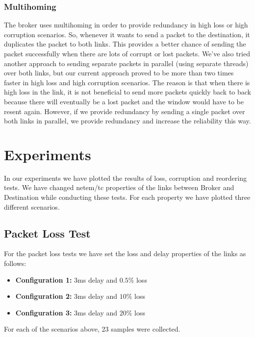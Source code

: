 \documentclass[conference]{IEEEtran}
\begin{document}
\subsubsection{Multihoming}
The broker uses multihoming in order to provide redundancy in high loss or high
corruption scenarios. So, whenever it wants to send a packet to the destination,
it duplicates the packet to both links. This provides a better chance of sending
the packet successfully when there are lots of corrupt or lost packets. We've also
tried another approach to sending separate packets in parallel (using separate threads)
over both links, but our current approach proved to be more than two times faster
in high loss and high corruption scenarios.
The reason is that when there is high loss in the link, it is not beneficial to
send more packets quickly back to back because there will eventually be a lost packet and
the window would have to be resent again. However, if we provide redundancy by sending a
single packet over both links in parallel, we provide redundancy and increase the
reliability this way.

\section{Experiments}

In our experiments we have plotted the results of loss, corruption and reordering tests. We have changed netem/tc properties of the links between Broker and Destination while conducting these tests.
For each property we have plotted three different scenarios.

\subsection{Packet Loss Test}\label{AA}

For the packet loss tests we have set the loss and delay properties of the links as follows:
\begin{itemize}
    \item \textbf{Configuration 1:} 3ms delay and $0.5\%$ loss
    \item \textbf{Configuration 2:} 3ms delay and $10\%$ loss
    \item \textbf{Configuration 3:} 3ms delay and $20\%$ loss
\end{itemize}
For each of the scenarios above, 23 samples were collected.
\end{document}
